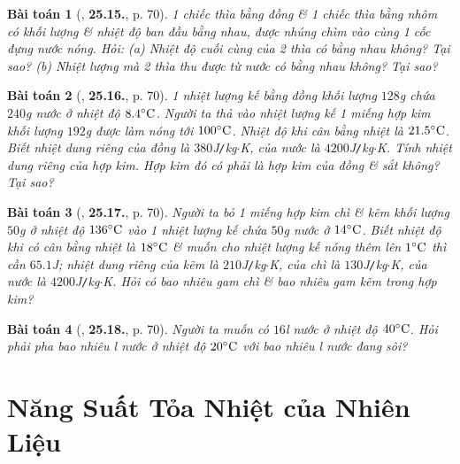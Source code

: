 \documentclass{article}
\numberwithin{equation}{section}
\newtheorem{baitoan}{Bài toán}
\begin{document}
\begin{baitoan}[\cite{SBT_Vat_Ly_8}, \textbf{25.15.}, p. 70]
	1 chiếc thìa bằng đồng \& 1 chiếc thìa bằng nhôm có khối lượng \& nhiệt độ ban đầu bằng nhau, được nhúng chìm vào cùng 1 cốc đựng nước nóng. Hỏi: (a) Nhiệt độ cuối cùng của 2 thìa có bằng nhau không? Tại sao? (b) Nhiệt lượng mà 2 thìa thu được từ nước có bằng nhau không? Tại sao?
\end{baitoan}

\begin{baitoan}[\cite{SBT_Vat_Ly_8}, \textbf{25.16.}, p. 70]
	1 nhiệt lượng kế bằng đồng khối lượng $128$\emph{g} chứa $240$\emph{g} nước ở nhiệt độ $8.4^\circ{\rm C}$. Người ta thả vào nhiệt lượng kế 1 miếng hợp kim khối lượng $192$\emph{g} được làm nóng tới $100^\circ{\rm C}$. Nhiệt độ khi cân bằng nhiệt là $21.5^\circ{\rm C}$. Biết nhiệt dung riêng của đồng là $380$\emph{J\texttt{/}kg$\cdot$K}, của nước là $4200$\emph{J\texttt{/}kg$\cdot$K}. Tính nhiệt dung riêng của hợp kim. Hợp kim đó có phải là hợp kim của đồng \& sắt không? Tại sao?
\end{baitoan}

\begin{baitoan}[\cite{SBT_Vat_Ly_8}, \textbf{25.17.}, p. 70]
	Người ta bỏ 1 miếng hợp kim chì \& kẽm khối lượng $50$\emph{g} ở nhiệt độ $136^\circ{\rm C}$ vào 1 nhiệt lượng kế chứa $50$\emph{g} nước ở $14^\circ{\rm C}$. Biết nhiệt độ khi có cân bằng nhiệt là $18^\circ{\rm C}$ \& muốn cho nhiệt lượng kế nóng thêm lên $1^\circ{\rm C}$ thì cần $65.1$\emph{J}; nhiệt dung riêng của kẽm là $210$\emph{J\texttt{/}kg$\cdot$K}, của chì là $130$\emph{J\texttt{/}kg$\cdot$K}, của nước là $4200$\emph{J\texttt{/}kg$\cdot$K}. Hỏi có bao nhiêu gam chì \& bao nhiêu gam kẽm trong hợp kim?
\end{baitoan}

\begin{baitoan}[\cite{SBT_Vat_Ly_8}, \textbf{25.18.}, p. 70]
	Người ta muốn có $16$\emph{l} nước ở nhiệt độ $40^\circ{\rm C}$. Hỏi phải pha bao nhiêu \emph{l} nước ở nhiệt độ $20^\circ{\rm C}$ với bao nhiêu \emph{l} nước đang sôi?
\end{baitoan}


\section{Năng Suất Tỏa Nhiệt của Nhiên Liệu}
\end{document}
